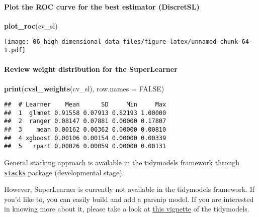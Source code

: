 \documentclass[
]{book}
\newenvironment{Shaded}{\begin{snugshade}}{\end{snugshade}}
\newcommand{\DataTypeTok}[1]{\textcolor[rgb]{0.13,0.29,0.53}{#1}}
\newcommand{\KeywordTok}[1]{\textcolor[rgb]{0.13,0.29,0.53}{\textbf{#1}}}
\newcommand{\NormalTok}[1]{#1}
\newcommand{\OtherTok}[1]{\textcolor[rgb]{0.56,0.35,0.01}{#1}}
\begin{document}
\hypertarget{plot-the-roc-curve-for-the-best-estimator-discretsl}{%
\paragraph{Plot the ROC curve for the best estimator (DiscretSL)}\label{plot-the-roc-curve-for-the-best-estimator-discretsl}}

\begin{Shaded}
\begin{Highlighting}[]
\KeywordTok{plot\_roc}\NormalTok{(cv\_sl)}
\end{Highlighting}
\end{Shaded}

\texttt{[image: 06\_high\_dimensional\_data\_files/figure-latex/unnamed-chunk-64-1.pdf]}

\hypertarget{review-weight-distribution-for-the-superlearner}{%
\paragraph{Review weight distribution for the SuperLearner}\label{review-weight-distribution-for-the-superlearner}}

\begin{Shaded}
\begin{Highlighting}[]
\KeywordTok{print}\NormalTok{(}\KeywordTok{cvsl\_weights}\NormalTok{(cv\_sl), }\DataTypeTok{row.names =} \OtherTok{FALSE}\NormalTok{)}
\end{Highlighting}
\end{Shaded}

\begin{verbatim}
##  # Learner    Mean      SD     Min     Max
##  1  glmnet 0.91558 0.07913 0.82193 1.00000
##  2  ranger 0.08147 0.07881 0.00000 0.17807
##  3    mean 0.00162 0.00362 0.00000 0.00810
##  4 xgboost 0.00106 0.00154 0.00000 0.00339
##  5   rpart 0.00026 0.00059 0.00000 0.00131
\end{verbatim}

General stacking approach is available in the tidymodels framework through \href{https://github.com/tidymodels/stacks}{\texttt{stacks}} package (developmental stage).

However, SuperLearner is currently not available in the tidymodels framework. If you'd like to, you can easily build and add a parsnip model. If you are interested in knowing more about it, please take a look at \href{https://www.tidymodels.org/learn/develop/models/}{this vignette} of the tidymodels.
\end{document}
